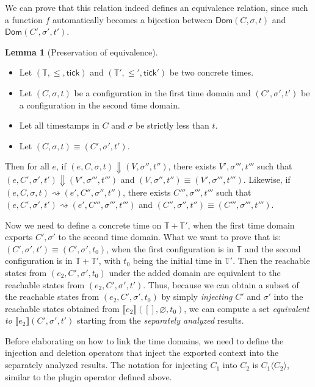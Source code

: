 \documentclass{article}
\theoremstyle{definition}
\newtheorem{lem}{Lemma}[section]
\newcommand*{\Time}{\mathbb{T}}
\newcommand*{\sembracket}[1]{\lBrack{#1}\rBrack}
\newcommand*{\tick}{\mathsf{tick}}
\newcommand*{\inject}[2]{{#1}\langle{#2}\rangle}
\begin{document}
We can prove that this relation indeed defines an equivalence relation, since such a function $f$ automatically becomes a bijection between $\mathsf{Dom}(C,\sigma,t)$ and $\mathsf{Dom}(C',\sigma',t')$.

\begin{lem}[Preservation of equivalence]
  $\:$

  \begin{itemize}
    \item Let $(\Time,\le,\tick)$ and $(\Time',\le',\tick')$ be two concrete times.
    \item Let $(C,\sigma,t)$ be a configuration in the first time domain and $(C',\sigma',t')$ be a configuration in the second time domain.
    \item Let all timestamps in $C$ and $\sigma$ be strictly less than $t$.
    \item Let $(C,\sigma,t)\equiv (C',\sigma',t')$.
  \end{itemize}

  Then for all $e$, if $(e,C,\sigma,t)\Downarrow(V,\sigma'',t'')$, there exists $V',\sigma''',t'''$ such that $(e,C',\sigma',t')\Downarrow(V',\sigma''',t''')$ and $(V,\sigma'',t'')\equiv(V',\sigma''',t''')$.
  Likewise, if $(e,C,\sigma,t)\rightsquigarrow(e',C'',\sigma'',t'')$, there exists $C''',\sigma''',t'''$ such that $(e,C',\sigma',t')\rightsquigarrow(e',C''',\sigma''',t''')$ and $(C'',\sigma'',t'')\equiv(C''',\sigma''',t''')$.
\end{lem}

Now we need to define a concrete time on $\Time+\Time'$, when the first time domain exports $C',\sigma'$ to the second time domain.
What we want to prove that is: $(C',\sigma',t')\equiv(C',\sigma',t_{0})$, when the first configuration is in $\Time$ and the second configuration is in $\Time+\Time'$, with $t_{0}$ being the initial time in $\Time'$.
Then the reachable states from $(e_{2},C',\sigma',t_{0})$ under the added domain are equivalent to the reachable states from $(e_{2},C',\sigma',t')$.
Thus, because we can obtain a subset of the reachable states from $(e_{2},C',\sigma',t_{0})$ by simply \emph{injecting} $C'$ and $\sigma'$ into the reachable states obtained from $\sembracket{e_{2}}([],\varnothing,t_{0})$, we can compute a set \textit{equivalent to} $\sembracket{e_{2}}(C',\sigma',t')$ starting from the \emph{separately analyzed} results.

Before elaborating on how to link the time domains, we need to define the injection and deletion operators that inject the exported context into the separately analyzed results.
The notation for injecting $C_{1}$ into $C_{2}$ is $\inject{C_{1}}{C_{2}}$, similar to the plugin operator defined above.
\end{document}
